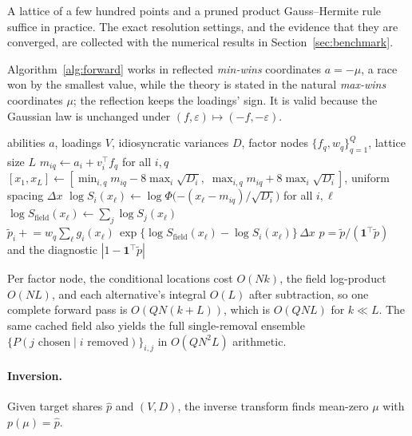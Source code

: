 \documentclass[12pt]{article}
\theoremstyle{remark}
\begin{document}
A lattice of a few hundred points and a pruned product Gauss--Hermite
rule suffice in practice. The exact resolution settings, and the
evidence that they are converged, are collected with the numerical
results in Section~\ref{sec:benchmark}.

Algorithm~\ref{alg:forward} works in reflected \emph{min-wins}
coordinates $a = -\mu$, a race won by the smallest value, while the
theory is stated in the natural \emph{max-wins} coordinates $\mu$; the reflection
keeps the loadings' sign. It is valid
because the Gaussian law is unchanged under $(f, \varepsilon) \mapsto
(-f, -\varepsilon)$.

\begin{algorithm}[H]
\caption{All-share forward pass (min-wins; reflected from argmax by $a = -\mu$)}
\label{alg:forward}
\begin{algorithmic}[1]
\Require abilities $a$, loadings $V$, idiosyncratic variances $D$, factor
nodes $\{f_q, w_q\}_{q=1}^{Q}$, lattice size $L$
\State $m_{iq} \gets a_i + v_i^\top f_q$ for all $i, q$
\State $[x_1, x_L] \gets [\min_{i,q} m_{iq} - 8\max_i \sqrt{D_i},\;
\max_{i,q} m_{iq} + 8\max_i \sqrt{D_i}]$, uniform spacing $\Delta x$
  \State $\log S_i(x_\ell) \gets \log\Phi\big({-(x_\ell -
  m_{iq})}/{\sqrt{D_i}}\big)$ for all $i, \ell$
  \State $\log S_{\mathrm{field}}(x_\ell) \gets \sum_j \log
  S_j(x_\ell)$
  \State $\tilde p_i \mathrel{+}= w_q \sum_\ell g_i(x_\ell)\,
  \exp\{\log S_{\mathrm{field}}(x_\ell) - \log S_i(x_\ell)\}\,
  \Delta x$ 
\EndFor
\State \Return $p = \tilde p / (\mathbf{1}^\top \tilde p)$ and the
diagnostic $|1 - \mathbf{1}^\top \tilde p|$
\end{algorithmic}
\end{algorithm}

Per factor node, the conditional
locations cost $O(Nk)$, the field log-product $O(NL)$, and each
alternative's integral $O(L)$ after subtraction, so one complete forward
pass is $O(QN(k+L))$, which is $O(QNL)$ for $k \ll L$. The same cached
field also yields the full single-removal ensemble $\{P(j \text{ chosen}
\mid i \text{ removed})\}_{i,j}$ in $O(QN^2L)$ arithmetic.

\paragraph{Inversion.} Given target shares $\hat p$ and $(V, D)$, the
inverse transform finds mean-zero $\mu$ with $p(\mu) = \hat p$.
\end{document}
